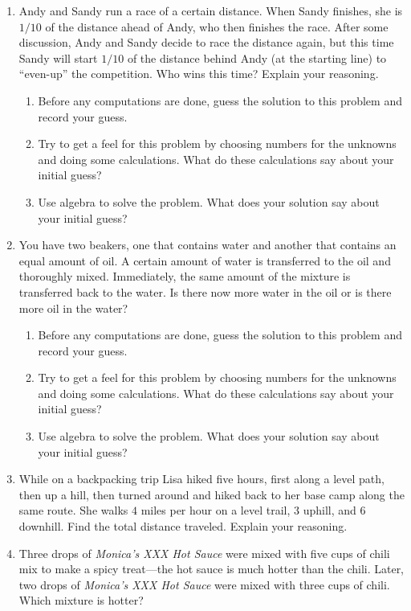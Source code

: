 \begin{problems}
\begin{enumerate}
\item Andy and Sandy run a race of a certain distance. When Sandy finishes, 
she is $1/10$ of the distance ahead of Andy, who then finishes the race. 
After some discussion, Andy and Sandy decide to race the distance again, but this time Sandy
  will start $1/10$ of the distance behind Andy (at the starting line) to ``even-up'' the
  competition. Who wins this time?  Explain your reasoning.  
\begin{enumerate}
\item Before any computations are done, guess the
  solution to this problem and record your guess.  
\item Try to get a feel for this problem by choosing numbers for the
  unknowns and doing some calculations. What do these calculations say
  about your initial guess?
\item Use algebra to solve the problem.  What does your solution say 
about your initial guess?  
\end{enumerate}

\item You have two beakers, one that contains water and another that
  contains an equal amount of oil. A certain amount of water is
  transferred to the oil and thoroughly mixed. Immediately, the same
  amount of the mixture is transferred back to the water. Is there now
  more water in the oil or is there more oil in the water?
\begin{enumerate}
\item Before any computations are done, guess the
  solution to this problem and record your guess.
\item Try to get a feel for this problem by choosing numbers for the
  unknowns and doing some calculations. What do these calculations say
  about your initial guess?
\item Use algebra to solve the problem.  What does your solution say 
about your initial guess?  
\end{enumerate}

\item While on a backpacking trip Lisa hiked five hours, first along a
  level path, then up a hill, then turned around and hiked back to her
  base camp along the same route. She walks $4$ miles per hour on a
  level trail, $3$ uphill, and $6$ downhill. Find the total distance
  traveled. Explain your reasoning.
\item Three drops of \textit{Monica's XXX Hot Sauce} were mixed with
  five cups of chili mix to make a spicy treat---the hot sauce is much
  hotter than the chili. Later, two drops of \textit{Monica's XXX Hot
    Sauce} were mixed with three cups of chili. Which mixture is
  hotter? 


\end{enumerate}
\end{problems}
